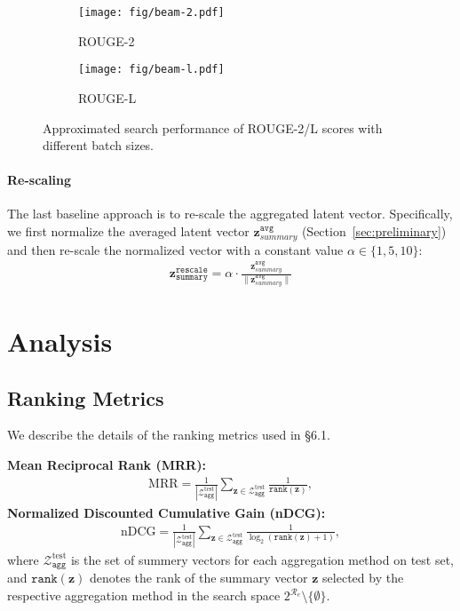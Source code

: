 \documentclass[11pt]{article}
\begin{document}
\begin{figure}[t]
    \centering
    \begin{subfigure}[b]{0.99\linewidth}
        \centering
        \texttt{[image: fig/beam-2.pdf]}
        \caption{ROUGE-2}
        \label{fig:beam-2}
    \end{subfigure}
    \begin{subfigure}[b]{0.99\linewidth}
        \centering
        \texttt{[image: fig/beam-l.pdf]}
        \caption{ROUGE-L}
        \label{fig:beam-l}
    \end{subfigure}
    \caption{Approximated search performance of ROUGE-2/L scores with different batch sizes.}
    \label{fig:beam-2l}
\end{figure}

\paragraph{Re-scaling}
The last baseline approach is to re-scale the aggregated latent vector. Specifically, we first normalize the averaged latent vector $\boldsymbol{z}^{\texttt{avg}}_{summary}$ (Section~\ref{sec:preliminary}) and then re-scale the normalized vector with a constant value $\alpha \in \{1, 5, 10\}$:
\begin{align*}
    \boldsymbol{z}^{\texttt{rescale}}_{\texttt{summary}} = \alpha \cdot \frac{\boldsymbol{z}^{\texttt{avg}}_{summary}}{\|\boldsymbol{z}^{\texttt{avg}}_{summary}\|}
\end{align*}

\section{Analysis}
\subsection{Ranking Metrics} \label{app:rank_metrics}
We describe the details of the ranking metrics used in \S 6.1.

\noindent
{\bf Mean Reciprocal Rank (MRR):}
\begin{align*}
    \text{MRR} = \frac{1}{|\mathcal{Z}^{\text{test}}_{\texttt{agg}}|} \sum_{\boldsymbol{z} \in \mathcal{Z}^{\text{test}}_{\texttt{agg}}} \frac{1}{\mathtt{rank}(\boldsymbol{z})},
\end{align*}
{\bf Normalized Discounted Cumulative Gain (nDCG):}
\begin{align*}
    \text{nDCG} = \frac{1}{|\mathcal{Z}^{\text{test}}_{\texttt{agg}}|} \sum_{\boldsymbol{z} \in \mathcal{Z}^{\text{test}}_{\texttt{agg}}} \frac{1}{\log_2(\mathtt{rank}(\boldsymbol{z}) + 1)},
\end{align*}
where $\mathcal{Z}^{\text{test}}_{\texttt{agg}}$ is the set of summery vectors for each aggregation method on test set, and $\mathtt{rank}(\boldsymbol{z})$ denotes the rank of the summary vector $\boldsymbol{z}$ selected by the respective aggregation method in the search space $2^{\mathcal{R}_e}\setminus\{\emptyset\}$.
\end{document}

